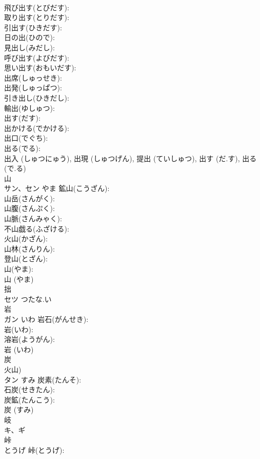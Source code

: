 \documentclass[8pt]{extreport}
\begin{document}
\begin{CJK}{UTF8}{min}
\\	飛び出す(とびだす): 
\\	取り出す(とりだす): 
\\	引出す(ひきだす): 
\\	日の出(ひので): 
\\	見出し(みだし): 
\\	呼び出す(よびだす): 
\\	思い出す(おもいだす): 
\\	出席(しゅっせき): 
\\	出発(しゅっぱつ): 
\\	引き出し(ひきだし): 
\\	輸出(ゆしゅつ): 
\\	出す(だす): 
\\	出かける(でかける): 
\\	出口(でぐち): 
\\	出る(でる): 
\\	出入 (しゅつにゅう), 出現 (しゅつげん), 提出 (ていしゅつ), 出す (だ.す), 出る (で.る)
\\	山			
\\	サン、セン	やま	鉱山(こうざん): 
\\	山岳(さんがく): 
\\	山腹(さんぷく): 
\\	山脈(さんみゃく): 
\\	不山戯る(ふざける): 
\\	火山(かざん): 
\\	山林(さんりん): 
\\	登山(とざん): 
\\	山(やま): 
\\	山 (やま)
\\	拙			
\\	セツ	つたな.い		
\\	岩			
\\	ガン	いわ	岩石(がんせき): 
\\	岩(いわ): 
\\	溶岩(ようがん): 
\\	岩 (いわ)
\\	炭			
\\	火山) 
\\	タン	すみ	炭素(たんそ): 
\\	石炭(せきたん): 
\\	炭鉱(たんこう): 
\\	炭 (すみ)
\\	岐			
\\	キ、ギ			
\\	峠			
\\	とうげ	峠(とうげ): 

\end{CJK}
\end{document}
